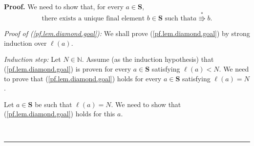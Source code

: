 \documentclass[numbers=enddot,12pt,final,onecolumn,notitlepage]{scrartcl}%
\theoremstyle{definition}
\newenvironment{proof}[1][Proof]{\noindent\textbf{#1.} }{\ \rule{0.5em}{0.5em}}
\newenvironment{verlong}{}{}
\begin{document}
\begin{verlong}
\begin{proof}
We need to show that, for every $a\in\mathbf{S}$,
\begin{equation}
\text{there exists a unique final element }b\in\mathbf{S}\text{ such that
}a\overset{\ast}{\Rrightarrow}b\text{.} \label{pf.lem.diamond.goal}%
\end{equation}


\textit{Proof of (\ref{pf.lem.diamond.goal}):} We shall prove
(\ref{pf.lem.diamond.goal}) by strong induction over $\ell\left(  a\right)  $.

\textit{Induction step:} Let $N\in\mathbb{N}$. Assume (as the induction
hypothesis) that (\ref{pf.lem.diamond.goal}) is proven for every
$a\in\mathbf{S}$ satisfying $\ell\left(  a\right)  <N$. We need to prove that
(\ref{pf.lem.diamond.goal}) holds for every $a\in\mathbf{S}$ satisfying
$\ell\left(  a\right)  =N$.

Let $a\in\mathbf{S}$ be such that $\ell\left(  a\right)  =N$. We need to show
that (\ref{pf.lem.diamond.goal}) holds for this $a$.


\end{proof}
\end{verlong}
\end{document}
